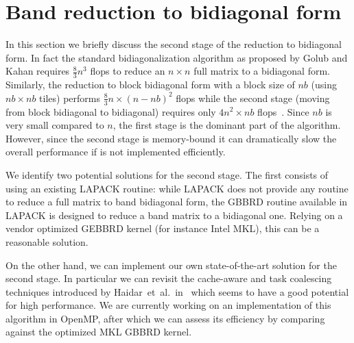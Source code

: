 \section{Band reduction to bidiagonal form}\label{sec:bidiag}
In this section we briefly discuss the second stage of the reduction
to bidiagonal form.
In fact the standard bidiagonalization
algorithm as proposed by Golub and Kahan requires $\frac{8}{3}n^3$
flops to reduce an $n \times n$ full matrix to a bidiagonal form.
Similarly, the reduction to block bidiagonal form with a
block size of $nb$ (using $nb \times nb$ tiles) performs
$\frac{8}{3} n\times (n-nb)^2$ flops while the second stage
(moving from block bidiagonal to bidiagonal)
requires only $4 n^2\times nb$ flops~\cite{ltaief2013high}.
Since $nb$ is very small compared to $n$,
the first stage is the dominant part of the algorithm.
However,
since the second stage is memory-bound it can dramatically slow the
overall performance if is not implemented efficiently.

We identify two potential solutions for the second stage.
The first consists of using an existing LAPACK routine:
while LAPACK does not provide any routine to reduce a
full matrix to band bidiagonal form,
the GBBRD routine available in LAPACK is designed to
reduce a band matrix to a bidiagonal one.
Relying on a vendor optimized GEBBRD kernel
(for instance Intel MKL), this can be a reasonable solution.

On the other hand, we can implement our own state-of-the-art
solution for the second stage.
In particular we can revisit the cache-aware
and task coalescing techniques introduced by
Haidar~et~al\@.~in~\cite{haidar2011parallel}
which seems to have a good potential for high performance.
We are currently working on an implementation of this
algorithm in OpenMP,
after which we can assess its efficiency by
comparing against the optimized MKL GBBRD kernel.
